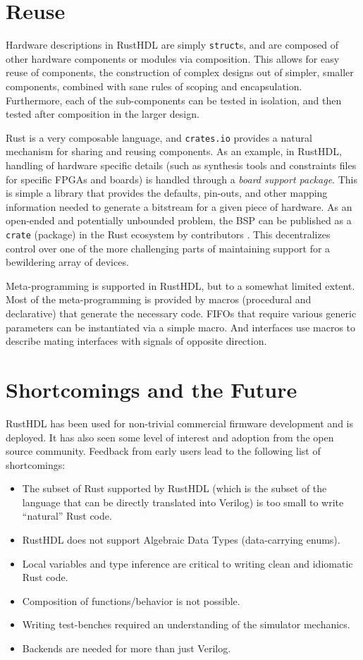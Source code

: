 \documentclass[sigplan,screen,sigconf]{acmart}
\begin{document}
\section{Reuse}
Hardware descriptions in RustHDL are simply \verb|struct|s, and are composed of other 
hardware components or modules via composition.  This allows for easy reuse of components, the
construction of complex designs out of simpler, smaller components, combined with 
sane rules of scoping and encapsulation.  Furthermore, each of the sub-components can be 
tested in isolation, and then tested after composition in the larger design. 

Rust is a very composable language, and \verb|crates.io| provides a natural mechanism
for sharing and reusing components.  As an example, in RustHDL, handling of hardware 
specific details (such as synthesis tools and constraints files for specific FPGAs and boards) 
is handled through a \emph{board support package}.  This is simple a library that provides the 
defaults, pin-outs, and other mapping information needed to generate a bitstream for a given 
piece of hardware.  As an open-ended and potentially unbounded problem, the BSP can be published 
as a \verb|crate| (package) in the Rust ecosystem by contributors \cite{b7}.  This decentralizes 
control over one of the more challenging parts of maintaining support for a bewildering array of devices. 

Meta-programming is supported in RustHDL, but to a somewhat limited extent.  Most of the 
meta-programming is provided by macros (procedural and declarative) that generate the 
necessary code.   FIFOs that require various generic parameters can be instantiated 
via a simple macro.  And interfaces use macros to describe mating interfaces with signals
of opposite direction.  

\section{Shortcomings and the Future}
RustHDL has been used for non-trivial commercial firmware development and is deployed.  
It has also seen some level of interest and adoption from the open source community.  
Feedback from early users lead to the following list of shortcomings:

\begin{itemize}
  \item The subset of Rust supported by RustHDL (which is the subset of the language 
  that can be directly translated into Verilog) is too small to write ``natural'' Rust code. 
  \item RustHDL does not support Algebraic Data Types (data-carrying enums).
  \item Local variables and type inference are critical to writing clean and
  idiomatic Rust code.  
  \item Composition of functions/behavior is not possible. 
  \item Writing test-benches required an understanding of the simulator mechanics.
  \item Backends are needed for more than just Verilog.
\end{itemize}
\end{document}
